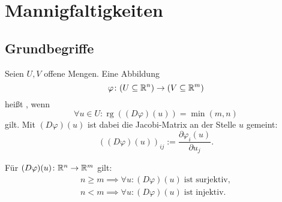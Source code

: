 \section{Mannigfaltigkeiten}
\subsection{Grundbegriffe}
\begin{Definition}
Seien $U,V$ offene Mengen. Eine Abbildung
\begin{equation}
\varphi\colon (U\subseteq\mathbb R^n)\to(V\subseteq\mathbb R^m)
\end{equation}
heißt , wenn
\begin{equation}
\forall u\in U\colon \operatorname{rg}((D\varphi)(u))=\min(m,n)
\end{equation}
gilt. Mit $(D\varphi)(u)$ ist dabei die Jacobi-Matrix an der Stelle
$u$ gemeint:
\begin{equation}
((D\varphi)(u))_{ij} := \frac{\partial\varphi_i(u)}{\partial u_j}.
\end{equation}
\end{Definition}
\noindent
Für $(D\varphi)(u)\colon\mathbb R^n\to\mathbb R^m$ gilt:
\begin{gather}
n{\ge}m\implies\forall u\colon (D\varphi)(u)\;\text{ist surjektiv},\\
n{<}m\implies\forall u\colon (D\varphi)(u)\;\text{ist injektiv}.
\end{gather}

